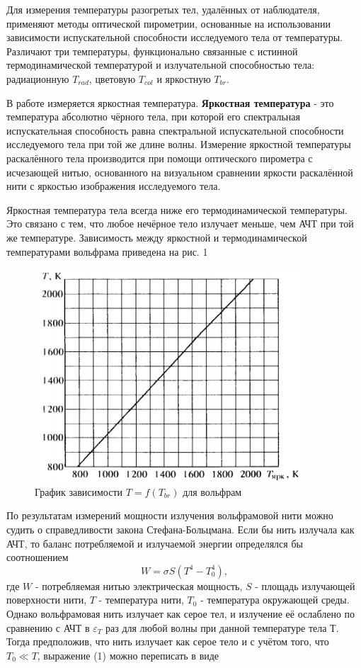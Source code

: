 \documentclass[a4paper,12pt]{article} %
\begin{document}
	Для измерения температуры разогретых тел, удалённых от наблюдателя, применяют методы оптической пирометрии, основанные на использовании зависимости испускательной способности исследуемого тела от температуры. Различают три температуры, функционально связанные с истинной термодинамической температурой и излучательной способностью тела: радиационную $T_{rad}$, цветовую $T_{col}$ и яркостную $T_{br}$. \par
	В работе измеряется яркостная температура. \textbf{Яркостная температура} - это температура абсолютно чёрного тела, при которой его спектральная испускательная способность равна спектральной испускательной способности исследуемого тела при той же длине волны.
	Измерение яркостной температуры раскалённого тела производится при помощи оптического пирометра с исчезающей нитью, основанного на визуальном сравнении яркости раскалённой нити с яркостью изображения исследуемого тела. \par
	Яркостная температура тела всегда ниже его термодинамической температуры. Это связано с тем, что любое нечёрное тело излучает меньше, чем АЧТ при той же температуре. Зависимость между яркостной и термодинамической температурами вольфрама приведена на рис. 1
	\begin{figure}[h]
		\centering
		\includegraphics[width=10cm]{fig2.PNG}
		\caption{График зависимости $T = f(T_{br})$ для вольфрам}
	\end{figure}
	По результатам измерений мощности излучения вольфрамовой нити можно судить о справедливости закона Стефана-Больцмана. Если бы нить излучала как АЧТ, то баланс потребляемой и излучаемой энергии определялся бы соотношением 
	\begin{equation}
		W = \sigma S (T^4 - T_0^4),
	\end{equation}
	где $W$ - потребляемая нитью электрическая мощность, $S$ - площадь излучающей поверхности нити, $T$ - температура нити, $T_0$ - температура окружающей среды. Однако вольфрамовая нить излучает как серое тел, и излучение её ослаблено по сравнению с АЧТ в $\varepsilon_T$ раз для любой волны при данной температуре тела Т. Тогда предположив, что нить излучает как серое тело и с учётом того, что $T_0 \ll T$, выражение (1) можно переписать в виде
\end{document}
